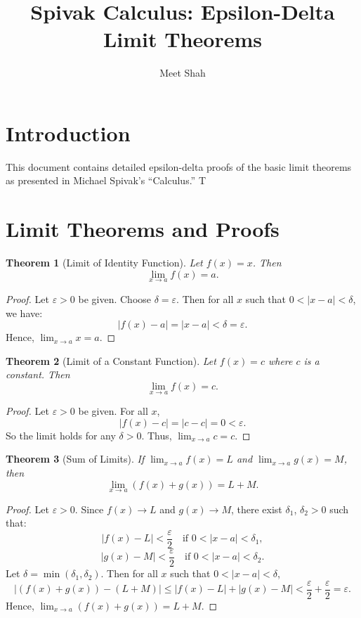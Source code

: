 \documentclass{article}
\title{\textbf{Spivak Calculus: Epsilon-Delta Limit Theorems}}
\author{Meet Shah}
\date{}
\newtheorem{theorem}{Theorem}
\begin{document}
\maketitle

\section*{Introduction}
This document contains detailed epsilon-delta proofs of the basic limit theorems as presented in Michael Spivak's ``Calculus.'' T

\section*{Limit Theorems and Proofs}

\begin{theorem}[Limit of Identity Function]
Let $f(x) = x$. Then
\[ \lim_{x \to a} f(x) = a. \]
\end{theorem}

\begin{proof}
Let $\varepsilon > 0$ be given. Choose $\delta = \varepsilon$. Then for all $x$ such that $0 < |x - a| < \delta$, we have:
\[
|f(x) - a| = |x - a| < \delta = \varepsilon.
\]
Hence, $\lim_{x \to a} x = a$.
\end{proof}

\begin{theorem}[Limit of a Constant Function]
Let $f(x) = c$ where $c$ is a constant. Then
\[ \lim_{x \to a} f(x) = c. \]
\end{theorem}

\begin{proof}
Let $\varepsilon > 0$ be given. For all $x$,
\[
|f(x) - c| = |c - c| = 0 < \varepsilon.
\]
So the limit holds for any $\delta > 0$. Thus, $\lim_{x \to a} c = c$.
\end{proof}

\begin{theorem}[Sum of Limits]
If $\lim_{x \to a} f(x) = L$ and $\lim_{x \to a} g(x) = M$, then
\[ \lim_{x \to a} (f(x) + g(x)) = L + M. \]
\end{theorem}

\begin{proof}
Let $\varepsilon > 0$. Since $f(x) \to L$ and $g(x) \to M$, there exist $\delta_1$, $\delta_2 > 0$ such that:
\[
|f(x) - L| < \frac{\varepsilon}{2} \quad \text{if } 0 < |x - a| < \delta_1,
\]
\[
|g(x) - M| < \frac{\varepsilon}{2} \quad \text{if } 0 < |x - a| < \delta_2.
\]
Let $\delta = \min(\delta_1, \delta_2)$. Then for all $x$ such that $0 < |x - a| < \delta$,
\[
|(f(x) + g(x)) - (L + M)| \leq |f(x) - L| + |g(x) - M| < \frac{\varepsilon}{2} + \frac{\varepsilon}{2} = \varepsilon.
\]
Hence, $\lim_{x \to a} (f(x) + g(x)) = L + M$.
\end{proof}
\end{document}
